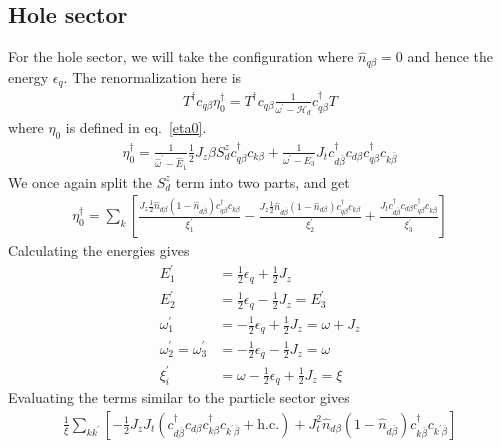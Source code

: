 \documentclass[twoside,11pt]{report}
\numberwithin{equation}{section}
\begin{document}
\subsection{Hole sector}
For the hole sector, we will take the configuration where \(\hat n_{q\beta} = 0\) and hence the energy \(\epsilon_q\). The renormalization here is
\begin{equation}\begin{aligned}
	T^\dagger c_{q\beta}\eta^\dagger_0 = T^\dagger c_{q\beta}\frac{1}{\omega^\prime - \mathcal{H}_d}c^\dagger_{q\beta} T
\end{aligned}\end{equation}
where \(\eta_0\) is defined in eq.~\ref{eta0}.
\begin{equation}\begin{aligned}
	\label{holeomega}
	\eta_0^\dagger = \frac{1}{\hat \omega^\prime - \hat E_1}\frac{1}{2}J_z \beta S_d^z c^\dagger_{q\beta}c_{k\beta} + \frac{1}{\omega^\prime - E_3}J_tc^\dagger_{d\overline\beta}c_{d\beta}c^\dagger_{q\beta}c_{k\overline\beta}
\end{aligned}\end{equation}
We once again split the \(S_d^z\) term into two parts, and get
\begin{equation}\begin{aligned}
	\eta^\dagger_0 = \sum_k \left[\frac{ J_z \frac{1}{2}\hat n_{d\beta}\left( 1 - \hat n_{d\overline\beta} \right) c^\dagger_{q\beta}c_{k\beta}}{\xi^\prime_1} - \frac{J_z \frac{1}{2}\hat n_{d\overline\beta}\left( 1 - \hat n_{d\beta} \right) c^\dagger_{q\beta}c_{k\beta}}{\xi^\prime_2} + \frac{J_t  c^\dagger_{d\overline\beta}c_{d\beta} c^\dagger_{q\beta}c_{k\overline\beta}}{\xi^\prime_3}\right] 
\end{aligned}\end{equation}
Calculating the energies gives
\begin{equation}\begin{aligned}
	E^\prime_1 &= \frac{1}{2}\epsilon_q + \frac{1}{2}J_z\\
	E^\prime_2 &= \frac{1}{2}\epsilon_q - \frac{1}{2}J_z = E^\prime_3\\
	\omega^\prime_1 &= - \frac{1}{2}\epsilon_q + \frac{1}{2}J_z = \omega + J_z\\
	\omega^\prime_2 = \omega^\prime_3 &= - \frac{1}{2}\epsilon_q - \frac{1}{2}J_z = \omega\\
	\xi_i^\prime &= \omega - \frac{1}{2}\epsilon_q + \frac{1}{2}J_z = \xi
\end{aligned}\end{equation}
Evaluating the terms similar to the particle sector gives
\begin{equation}\begin{aligned}
	\label{kondo_hole}
	\frac{1}{\xi}\sum_{kk^\prime} \left[ -\frac{1}{2} J_z J_t\left(c^\dagger_{d\overline\beta}c_{d\beta}c^\dagger_{k\beta}c_{k^\prime\overline\beta} + \text{h.c.}\right) + J_t^2 \hat n_{d\beta}\left(1 - \hat n_{d\overline\beta}\right) c^\dagger_{k\overline\beta}c_{k^\prime\overline\beta}\right]
\end{aligned}\end{equation}
\end{document}
